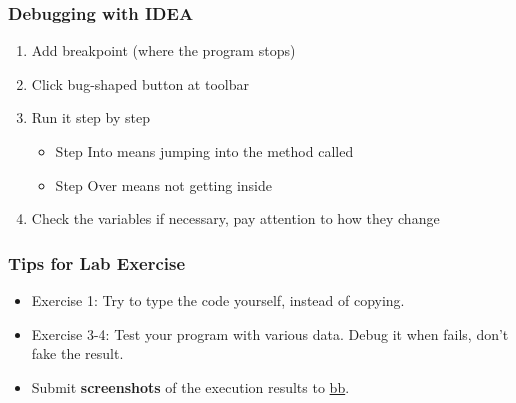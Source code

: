 \documentclass{beamer}
\begin{document}
\begin{frame}
    \frametitle{Debugging with IDEA}
    \begin{enumerate}
        \item Add breakpoint (where the program stops)
        \item Click bug-shaped button at toolbar
        \item Run it step by step
        \begin{itemize}
            \item Step Into means jumping into the method called
            \item Step Over means not getting inside
        \end{itemize}
        \item Check the variables if necessary,
        pay attention to how they change
    \end{enumerate}
\end{frame}

\begin{frame}
    \frametitle{Tips for Lab Exercise}
    \begin{itemize}
        \item Exercise 1:
        Try to type the code yourself, instead of copying.
        \item Exercise 3-4:
        Test your program with various data.\newline
        Debug it when fails, don't fake the result.
        \item Submit \textbf{screenshots} of the execution results to \href{https://bb.sustech.edu.cn}{bb}.
    \end{itemize}
    
\end{frame}
\end{document}
